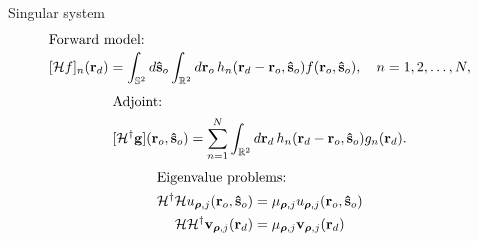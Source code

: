 \documentclass[presentation]{beamer}
\providecommand{\mb}[1]{\mathbf{#1}}
\providecommand{\ro}[1]{\mathbf{\mathbf{r}}_o}
\providecommand{\so}[1]{\mathbf{\hat{s}}_o}
\providecommand{\rd}[1]{\mathbf{r}_d}
\providecommand{\mbb}[1]{\mathbb{#1}}
\providecommand{\bs}[1]{\boldsymbol{#1}}
\begin{document}
\begin{frame}{Singular system}
  \vspace{-2em}
  \begin{align*}
    \intertext{Forward model:}
    [\mathcal{H}f]_n(\rd{}) = \int_{\mbb{S}^2}d\so{}\int_{\mbb{R}^2}d\ro{}\, h_n(\rd{} -\ro{}, \so{})f(\ro{}, \so{}),\quad  n=1, 2,\ldots,N,
    \end{align*}
    \begin{align*}    
    \intertext{Adjoint:}
    [\mathcal{H}^{\dagger}\mb{g}](\ro{}, \so{}) = \sum_{n=1}^N\int_{\mbb{R}^2}d\mb{r}_{d}\, h_n(\rd{} - \ro{}, \so{})g_n(\rd{}).\label{eq:adj}
    \end{align*}
    \begin{align*}
    \intertext{Eigenvalue problems:}
      \mathcal{H}^{\dagger}\mathcal{H}u_{\bs{\rho},j}(\ro{}, \so{}) &= \mu_{\bs{\rho},j}u_{\bs{\rho},j}(\ro{}, \so{})\\
    \mathcal{H}\mathcal{H}^{\dagger}\mb{v}_{\bs{\rho},j}(\rd{}) &= \mu_{\bs{\rho},j}\mb{v}_{\bs{\rho},j}(\rd{})         
  \end{align*}
\end{frame}
\end{document}
